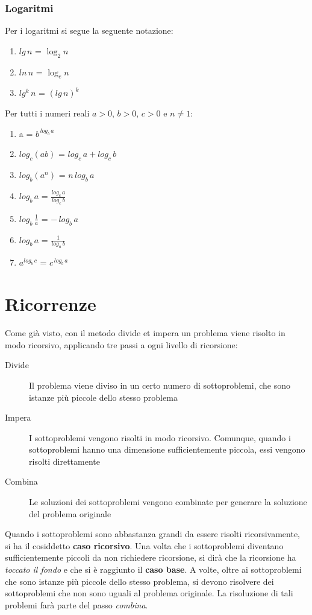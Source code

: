 \documentclass[10pt, a4paper]{report}
\begin{document}
\subsection{Logaritmi}
Per i logaritmi si segue la seguente notazione:
\begin{enumerate}
\item[]$lg\,n$ = $\log_{2}{n}$
\item[]$ln\,n$ = $\log_{e}{n}$
\item[]$lg^k\,n$ = $(lg\,n)^k$
\end{enumerate}
Per tutti i numeri reali $a > 0$, $b > 0$, $c > 0$ e $n \neq 1$:
\begin{enumerate}
\item[]a = $b^{\,log_{b}{\,a}}$
\item[]$log_{c}{(ab)}$ = $log_{c}{\,a} + log_{c}{\,b}$
\item[]$log_{b}{(a^n)}$ = $n$\,$log_{b}{\,a}$
\item[]$log_{b}{\,a}$ = $\frac{log_{c}{\,a}}{log_{c}{\,b}}$
\item[]$log_{b}{\,\frac{1}{a}}$ = $-\,log_{b}{\,a}$
\item[]$log_{b}{\,a}$ = $\frac{1}{log_{a}{\,b}}$
\item[]$a^{log_{b}{\,c}}$ = $c^{\,log_{b}{\,a}}$
\end{enumerate}
\chapter{Ricorrenze}
Come già visto, con il metodo divide et impera un problema viene risolto in modo ricorsivo, applicando tre passi a ogni livello di ricorsione:
\begin{description}
\item[Divide] Il problema viene diviso in un certo numero di sottoproblemi, che sono istanze più piccole dello stesso problema
\item[Impera]I sottoproblemi vengono risolti in modo ricorsivo. Comunque, quando i sottoproblemi hanno una dimensione sufficientemente piccola, essi vengono risolti direttamente
\item[Combina]Le soluzioni dei sottoproblemi vengono combinate per generare la soluzione del problema originale
\end{description}
Quando i sottoproblemi sono abbastanza grandi da essere risolti ricorsivamente, si ha il cosiddetto \textbf{caso ricorsivo}. Una volta che i sottoproblemi diventano sufficientemente piccoli da non richiedere ricorsione, si dirà che la ricorsione ha \textsl{toccato il fondo} e che si è raggiunto il \textbf{caso base}. A volte, oltre ai sottoproblemi che sono istanze più piccole dello stesso problema, si devono risolvere dei sottoproblemi che non sono uguali al problema originale. La risoluzione di tali problemi farà parte del passo \textsl{combina}.
\end{document}
